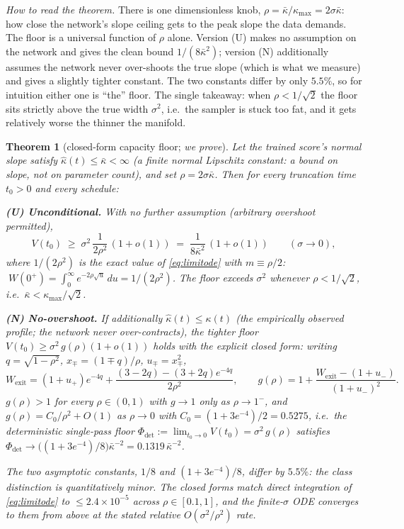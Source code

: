 \documentclass[11pt]{article}
\newtheorem{theorem}{Theorem}
\theoremstyle{remark}
\newcommand{\kb}{\bar\kappa}
\newcommand{\Phidet}{\Phi_{\mathrm{det}}}
\newcommand{\sigsq}{\sigma^2}
\begin{document}
\emph{How to read the theorem.} There is one dimensionless knob, $\rho=\kb/\kappa_{\max}=
2\sigma\kb$: how close the network's slope ceiling gets to the peak slope the data demands.
The floor is a universal function of $\rho$ alone. Version (U) makes no assumption on the
network and gives the clean bound $1/(8\kb^2)$; version (N) additionally assumes the
network never over-shoots the true slope (which is what we measure) and gives a slightly
tighter constant. The two constants differ by only $5.5\%$, so for intuition either one is
``the'' floor. The single takeaway: when $\rho<1/\sqrt2$ the floor sits strictly above the
true width $\sigsq$, i.e.\ the sampler is stuck too fat, and it gets relatively worse the
thinner the manifold.

\begin{theorem}[closed-form capacity floor; \emph{we prove}]\label{thm:floor}
Let the trained score's normal slope satisfy $\hat\kappa(t)\le\kb<\infty$
(a finite normal Lipschitz constant: a bound on slope, not on parameter count), and set
$\rho=2\sigma\kb$. Then for every truncation time $t_0>0$ and every schedule:

\textbf{(U) Unconditional.} With no further assumption (arbitrary overshoot permitted),
\begin{equation}
V(t_0)\;\ge\;\sigsq\,\frac{1}{2\rho^2}\,(1+o(1))
\;=\;\frac{1}{8\kb^2}\,(1+o(1)) \qquad(\sigma\to0),
\label{eq:uncond}
\end{equation}
where $1/(2\rho^2)$ is the \emph{exact} value of \eqref{eq:limitode} with $m\equiv\rho/2$:
$\;W(0^+)=\int_0^\infty e^{-2\rho\sqrt u}\,du=1/(2\rho^2)$. The floor exceeds $\sigsq$
whenever $\rho<1/\sqrt2$, i.e.\ $\kb<\kappa_{\max}/\sqrt2$.

\textbf{(N) No-overshoot.} If additionally $\hat\kappa(t)\le\kappa(t)$ (the empirically
observed profile; the network never over-contracts), the tighter floor
$V(t_0)\ge\sigsq\,g(\rho)(1+o(1))$ holds with the explicit closed form: writing
$q=\sqrt{1-\rho^2}$, $x_\mp=(1\mp q)/\rho$, $u_\mp=x_\mp^2$,
\begin{equation}
W_{\mathrm{exit}}=(1+u_+)e^{-4q}+\frac{(3-2q)-(3+2q)e^{-4q}}{2\rho^2},
\qquad
g(\rho)=1+\frac{W_{\mathrm{exit}}-(1+u_-)}{(1+u_-)^2} .
\label{eq:closedform}
\end{equation}
$g(\rho)>1$ for every $\rho\in(0,1)$ with $g\to1$ only as $\rho\to1^-$, and
$g(\rho)=C_0/\rho^2+O(1)$ as $\rho\to0$ with $C_0=(1+3e^{-4})/2=0.5275$, i.e.\ the
deterministic single-pass floor $\Phidet:=\lim_{t_0\to0}V(t_0)=\sigsq\,g(\rho)$
satisfies $\Phidet\to\big((1+3e^{-4})/8\big)\kb^{-2}=0.1319\,\kb^{-2}$.

The two asymptotic constants, $1/8$ and $(1+3e^{-4})/8$, differ by $5.5\%$: the class
distinction is quantitatively minor. The closed forms match direct integration of
\eqref{eq:limitode} to $\le2.4\times10^{-5}$ across $\rho\in[0.1,1]$, and the
finite-$\sigma$ ODE converges to them from above at the stated relative
$O(\sigsq/\rho^2)$ rate.
\end{theorem}
\end{document}
